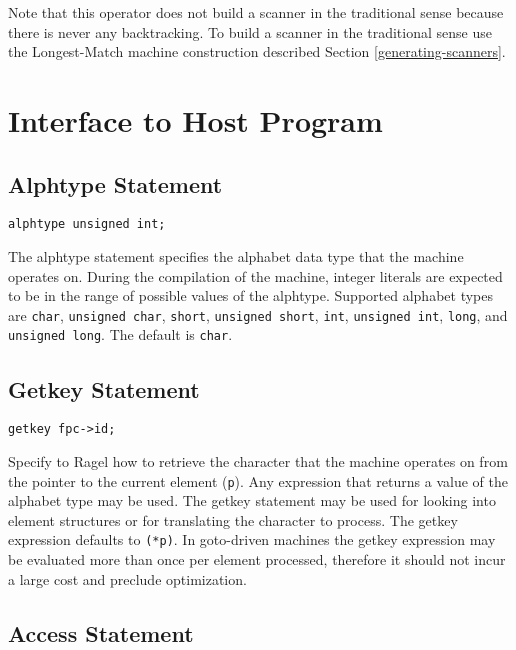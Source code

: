 \documentclass[letterpaper,11pt,oneside]{book}
\newcommand{\verbspace}{\vspace{10pt}}
\begin{document}
Note that this operator does not build a scanner in the traditional sense because
there is never any backtracking. To build a scanner in the traditional sense
use the Longest-Match machine construction described Section \ref{generating-scanners}.

\chapter{Interface to Host Program}

\section{Alphtype Statement}

\begin{verbatim}
alphtype unsigned int;
\end{verbatim}
\verbspace

The alphtype statement specifies the alphabet data type that the machine
operates on. During the compilation of the machine, integer literals are expected to
be in the range of possible values of the alphtype.  Supported alphabet types
are \verb|char|, \verb|unsigned char|, \verb|short|, \verb|unsigned short|,
\verb|int|, \verb|unsigned int|, \verb|long|, and \verb|unsigned long|. 
The default is \verb|char|.

\section{Getkey Statement}

\begin{verbatim}
getkey fpc->id;
\end{verbatim}
\verbspace

Specify to Ragel how to retrieve the character that the machine operates on
from the pointer to the current element (\verb|p|). Any expression that returns
a value of the alphabet type
may be used. The getkey statement may be used for looking into element
structures or for translating the character to process. The getkey expression
defaults to \verb|(*p)|. In goto-driven machines the getkey expression may be
evaluated more than once per element processed, therefore it should not incur a
large cost and preclude optimization.

\section{Access Statement}
\end{document}
